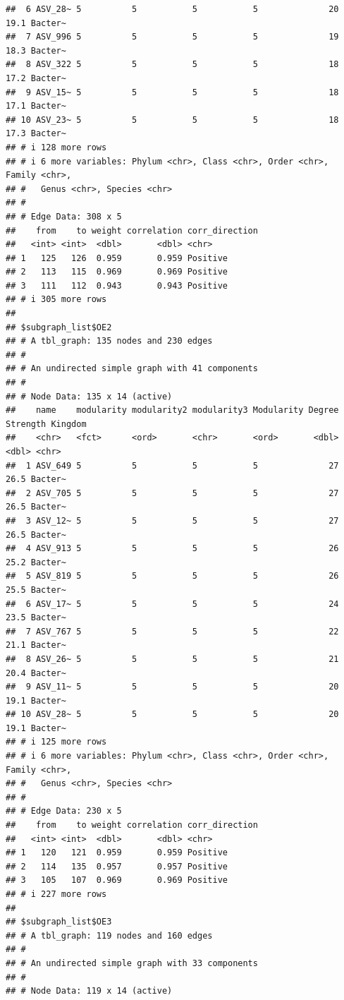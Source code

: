 \documentclass[
]{book}
\begin{document}
\begin{verbatim}
##  6 ASV_28~ 5          5           5           5              20     19.1 Bacter~
##  7 ASV_996 5          5           5           5              19     18.3 Bacter~
##  8 ASV_322 5          5           5           5              18     17.2 Bacter~
##  9 ASV_15~ 5          5           5           5              18     17.1 Bacter~
## 10 ASV_23~ 5          5           5           5              18     17.3 Bacter~
## # i 128 more rows
## # i 6 more variables: Phylum <chr>, Class <chr>, Order <chr>, Family <chr>,
## #   Genus <chr>, Species <chr>
## #
## # Edge Data: 308 x 5
##    from    to weight correlation corr_direction
##   <int> <int>  <dbl>       <dbl> <chr>         
## 1   125   126  0.959       0.959 Positive      
## 2   113   115  0.969       0.969 Positive      
## 3   111   112  0.943       0.943 Positive      
## # i 305 more rows
## 
## $subgraph_list$OE2
## # A tbl_graph: 135 nodes and 230 edges
## #
## # An undirected simple graph with 41 components
## #
## # Node Data: 135 x 14 (active)
##    name    modularity modularity2 modularity3 Modularity Degree Strength Kingdom
##    <chr>   <fct>      <ord>       <chr>       <ord>       <dbl>    <dbl> <chr>  
##  1 ASV_649 5          5           5           5              27     26.5 Bacter~
##  2 ASV_705 5          5           5           5              27     26.5 Bacter~
##  3 ASV_12~ 5          5           5           5              27     26.5 Bacter~
##  4 ASV_913 5          5           5           5              26     25.2 Bacter~
##  5 ASV_819 5          5           5           5              26     25.5 Bacter~
##  6 ASV_17~ 5          5           5           5              24     23.5 Bacter~
##  7 ASV_767 5          5           5           5              22     21.1 Bacter~
##  8 ASV_26~ 5          5           5           5              21     20.4 Bacter~
##  9 ASV_11~ 5          5           5           5              20     19.1 Bacter~
## 10 ASV_28~ 5          5           5           5              20     19.1 Bacter~
## # i 125 more rows
## # i 6 more variables: Phylum <chr>, Class <chr>, Order <chr>, Family <chr>,
## #   Genus <chr>, Species <chr>
## #
## # Edge Data: 230 x 5
##    from    to weight correlation corr_direction
##   <int> <int>  <dbl>       <dbl> <chr>         
## 1   120   121  0.959       0.959 Positive      
## 2   114   135  0.957       0.957 Positive      
## 3   105   107  0.969       0.969 Positive      
## # i 227 more rows
## 
## $subgraph_list$OE3
## # A tbl_graph: 119 nodes and 160 edges
## #
## # An undirected simple graph with 33 components
## #
## # Node Data: 119 x 14 (active)

\end{verbatim}
\end{document}
